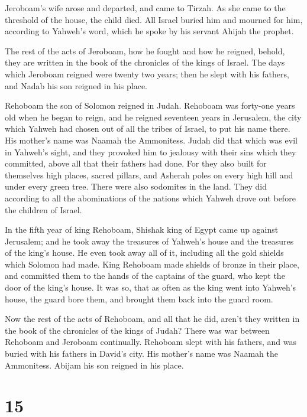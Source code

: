  Jeroboam's wife arose and departed, and came to Tirzah.
As she came to the threshold of the house, the child died.
 All Israel buried him and mourned for him, according to
Yahweh's word, which he spoke by his servant Ahijah the prophet.

 The rest of the acts of Jeroboam, how he fought and how
he reigned, behold, they are written in the book of the chronicles of
the kings of Israel.  The days which Jeroboam reigned
were twenty two years; then he slept with his fathers, and Nadab his son
reigned in his place.

 Rehoboam the son of Solomon reigned in Judah. Rehoboam
was forty-one years old when he began to reign, and he reigned seventeen
years in Jerusalem, the city which Yahweh had chosen out of all the
tribes of Israel, to put his name there. His mother's name was Naamah
the Ammonitess.  Judah did that which was evil in
Yahweh's sight, and they provoked him to jealousy with their sins which
they committed, above all that their fathers had done. 
For they also built for themselves high places, sacred pillars, and
Asherah poles on every high hill and under every green tree.
 There were also sodomites in the land. They did
according to all the abominations of the nations which Yahweh drove out
before the children of Israel.

 In the fifth year of king Rehoboam, Shishak king of
Egypt came up against Jerusalem;  and he took away the
treasures of Yahweh's house and the treasures of the king's house. He
even took away all of it, including all the gold shields which Solomon
had made.  King Rehoboam made shields of bronze in their
place, and committed them to the hands of the captains of the guard, who
kept the door of the king's house.  It was so, that as
often as the king went into Yahweh's house, the guard bore them, and
brought them back into the guard room.

 Now the rest of the acts of Rehoboam, and all that he
did, aren't they written in the book of the chronicles of the kings of
Judah?  There was war between Rehoboam and Jeroboam
continually.  Rehoboam slept with his fathers, and was
buried with his fathers in David's city. His mother's name was Naamah
the Ammonitess. Abijam his son reigned in his place.

\hypertarget{section-14}{%
\section{15}\label{section-14}}

